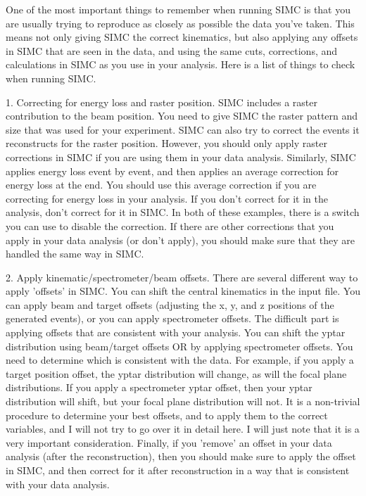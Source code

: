 One of the most important things to remember when running SIMC is that you
are usually trying to reproduce as closely as possible the data you've taken.
This means not only giving SIMC the correct kinematics, but also applying
any offsets in SIMC that are seen in the data, and using the same cuts,
corrections, and calculations in SIMC as you use in your analysis.  Here
is a list of things to check when running SIMC.

\smallskip

1. Correcting for energy loss and raster position.  SIMC includes a raster
contribution to the beam position.  You need to give SIMC the raster pattern
and size that was used for your experiment.  SIMC can also try to correct
the events it reconstructs for the raster position.  However, you should
only apply raster corrections in SIMC if you are using them in your data
analysis.  Similarly, SIMC applies energy loss event by event, and then
applies an average correction for energy loss at the end.  You should
use this average correction if you are correcting for energy loss in your
analysis.  If you don't correct for it in the analysis, don't correct for
it in SIMC.  In both of these examples, there is a switch you can use to
disable the correction.  If there are other corrections that you apply in
your data analysis (or don't apply), you should make sure that they are
handled the same way in SIMC.

\smallskip

2. Apply kinematic/spectrometer/beam offsets.  There are several different
way to apply 'offsets' in SIMC.  You can shift the central kinematics
in the input file.  You can apply beam and target offsets (adjusting
the x, y, and z positions of the generated events), or you can apply
spectrometer offsets.  The difficult part is applying offsets that
are consistent with your analysis.  You can shift the yptar distribution
using beam/target offsets OR by applying spectrometer offsets.  You need
to determine which is consistent with the data.  For example, if you
apply a target position offset, the yptar distribution will change,
as will the focal plane distributions.  If you apply a spectrometer
yptar offset, then your yptar distribution will shift, but your focal
plane distribution will not.  It is a non-trivial procedure to determine
your best offsets, and to apply them to the correct variables, and I will
not try to go over it in detail here.  I will just note that it is a very
important consideration.  Finally, if you 'remove' an offset in your
data analysis (after the reconstruction), then you should make sure to
apply the offset in SIMC, and then correct for it after reconstruction
in a way that is consistent with your data analysis.

